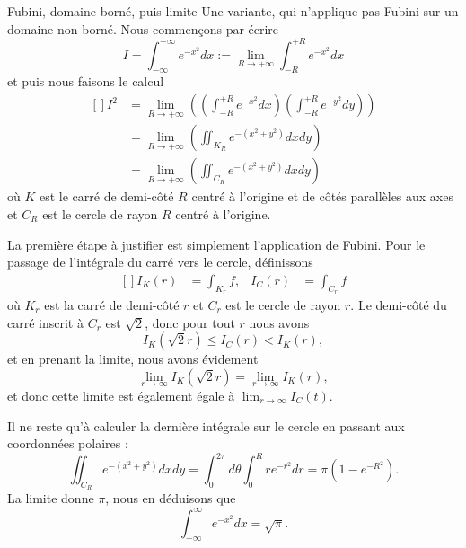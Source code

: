 \begin{example}
\begin{subproof}
        \item[Fubini, domaine borné, puis limite]
    Une variante, qui n'applique pas Fubini sur un domaine non borné. Nous commençons par écrire
\begin{equation}
	I=\int_{-\infty}^{+\infty} e^{-x^2} dx := \lim_{R \to +\infty} \int_{-R}^{+R} e^{-x^2} dx 
\end{equation}
et puis nous faisons le calcul
\begin{equation}		\label{EqCalculInteeemoisxcar}
	\begin{aligned}[]
		I^2 &= \lim_{R \to +\infty} \left( (\int_{-R}^{+R} e^{-x^2} dx)( \int_{-R}^{+R} e^{-y^2} dy) \right) \\
		&= \lim_{R \to +\infty} \left( \iint_{K_R}e^{-(x^2+y^2)} dx dy \right) \\
		&= \lim_{R \to +\infty} \left( \iint_{C_R}e^{-(x^2+y^2)} dx dy \right) 
	\end{aligned}
\end{equation}
où $K$ est le carré de demi-côté $R$ centré à l'origine et de côtés parallèles aux axes et $C_R$ est le cercle de rayon $R$ centré à l'origine.

	La première étape à justifier est simplement l'application de Fubini. Pour le passage de l'intégrale du carré vers le cercle, définissons
	\begin{equation}
		\begin{aligned}[]
			I_K(r)&=\int_{K_r}f,&I_C(r)&=\int_{C_r}f
		\end{aligned}
	\end{equation}
	où $K_r$ est la carré de demi-côté $r$ et $C_r$ est le cercle de rayon $r$. Le demi-côté du carré inscrit à $C_r$ est $\sqrt{2}$, donc pour tout $r$ nous avons
	\begin{equation}
		I_K(\sqrt{2}r)\leq I_C(r)<I_K(r),
	\end{equation}
	et en prenant la limite, nous avons évidement
	\begin{equation}
		\lim_{r\to \infty}I_K(\sqrt{2}r)=\lim_{r\to\infty}I_K(r),
	\end{equation}
	et donc cette limite est également égale à $\lim_{r\to\infty}I_C(t)$.

    Il ne reste qu'à calculer la dernière intégrale sur le cercle en passant aux coordonnées polaires :
	\begin{equation}
        \iint_{C_R} e^{-(x^2+y^2)}dxdy=\int_0^{2\pi}d\theta\int_0^Rr e^{-r^2}dr=\pi(1- e^{-R^2}).
	\end{equation}
	La limite donne $\pi$, nous en déduisons que
    \begin{equation}    \label{EqFDvHTg}
		\int_{-\infty}^{\infty} e^{-x^2}dx=\sqrt{\pi}.
	\end{equation}
    \end{subproof}

\end{example}

